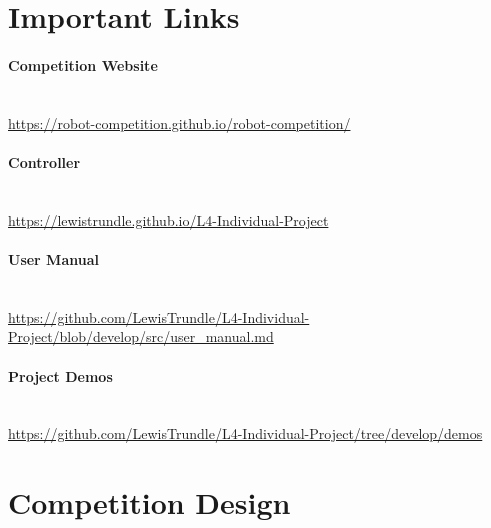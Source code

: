 \documentclass{l4proj}
\begin{document}
\begin{appendices}

\chapter{Important Links}
\subsubsection{Competition Website} \hfill \\
\url{https://robot-competition.github.io/robot-competition/}
\\
\subsubsection{Controller} \hfill \\
\url{https://lewistrundle.github.io/L4-Individual-Project}
\\
\subsubsection{User Manual} \hfill \\
\url{https://github.com/LewisTrundle/L4-Individual-Project/blob/develop/src/user\_manual.md}
\\
\subsubsection{Project Demos} \hfill \\
\url{https://github.com/LewisTrundle/L4-Individual-Project/tree/develop/demos}



\chapter{Competition Design}\label{app:comp-design}

\end{appendices}
\end{document}
